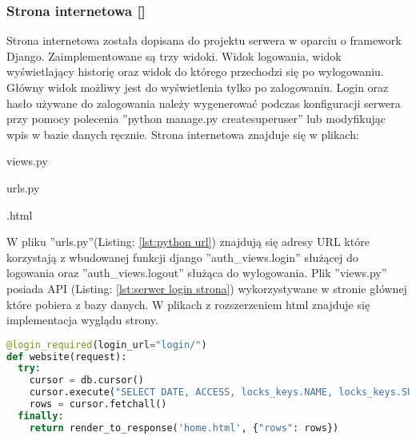 	\subsubsection{Strona internetowa [\StudentB]}
	Strona internetowa została dopisana do projektu serwera w oparciu o framework Django. Zaimplementowane są trzy widoki. Widok logowania, widok wyświetlający historię oraz widok do którego przechodzi się po wylogowaniu. Główny widok możliwy jest do wyświetlenia tylko po zalogowaniu. Login oraz hasło używane do zalogowania należy wygenerować podczas konfiguracji serwera przy pomocy polecenia ''python manage.py createsuperuser'' lub modyfikując wpis w bazie danych ręcznie. Strona internetowa znajduje się w plikach:
	\begin{itemize*}
		\item views.py
		\item urls.py
		\item *.html
	\end{itemize*}
 
	W pliku ''urls.py''(Listing: \ref{lst:python url}) znajdują się adresy URL które korzystają z wbudowanej funkcji django ''auth\_views.login'' służącej do logowania oraz ''auth\_views.logout'' służąca do wylogowania. Plik ''views.py'' posiada API (Listing: \ref{lst:serwer login strona}) wykorzystywane w stronie głównej które pobiera z bazy danych. W plikach z rozszerzeniem html znajduje się implementacja wyglądu strony.
	
	{\footnotesize 
		\begin{lstlisting}[caption={API logowania do strony internetowej}, label={lst:serwer login strona}, language=Python]	
@login_required(login_url="login/")
def website(request):
  try:
    cursor = db.cursor()
    cursor.execute("SELECT DATE, ACCESS, locks_keys.NAME, locks_keys.SURNAME, locks.NAME AS 'ZAMEK' FROM access_to_locks, locks_keys, locks WHERE locks_keys.ID_KEY = access_to_locks.ID_KEY AND locks.ID_LOCK = access_to_locks.ID_KEY ORDER BY DATE DESC")
    rows = cursor.fetchall()
  finally:
    return render_to_response('home.html', {"rows": rows})
		\end{lstlisting}}
